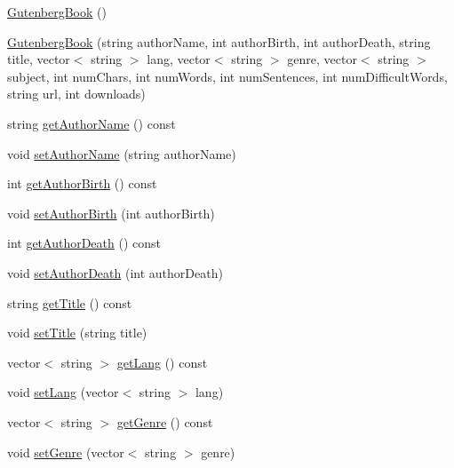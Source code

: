 \begin{DoxyCompactItemize}
\item 
\hyperlink{classbridges_1_1_gutenberg_book_a289c167dd11eed17cce39a59931f246c}{Gutenberg\+Book} ()
\item 
\hyperlink{classbridges_1_1_gutenberg_book_ab792768f0f2567835e90659f163f4438}{Gutenberg\+Book} (string author\+Name, int author\+Birth, int author\+Death, string title, vector$<$ string $>$ lang, vector$<$ string $>$ genre, vector$<$ string $>$ subject, int num\+Chars, int num\+Words, int num\+Sentences, int num\+Difficult\+Words, string url, int downloads)
\item 
string \hyperlink{classbridges_1_1_gutenberg_book_afacaf4beed079b9ac71622f1b24ff964}{get\+Author\+Name} () const 
\item 
void \hyperlink{classbridges_1_1_gutenberg_book_ab7b3a1d3398b75100b8d3fb7936b3ac9}{set\+Author\+Name} (string author\+Name)
\item 
int \hyperlink{classbridges_1_1_gutenberg_book_aca4767ac651f6bd056c3ae9dca394bad}{get\+Author\+Birth} () const 
\item 
void \hyperlink{classbridges_1_1_gutenberg_book_a33ac2e6063319064006fa72b6fcfb0dc}{set\+Author\+Birth} (int author\+Birth)
\item 
int \hyperlink{classbridges_1_1_gutenberg_book_a1a03188161b257b68fe667c4e95080c7}{get\+Author\+Death} () const 
\item 
void \hyperlink{classbridges_1_1_gutenberg_book_acf1e81a3b635fb939bc6af772a61fd3c}{set\+Author\+Death} (int author\+Death)
\item 
string \hyperlink{classbridges_1_1_gutenberg_book_a77e678b4fc06d6d64e75a80a8350ed05}{get\+Title} () const 
\item 
void \hyperlink{classbridges_1_1_gutenberg_book_a5038252948e5f173dad4926c0970c5d3}{set\+Title} (string title)
\item 
vector$<$ string $>$ \hyperlink{classbridges_1_1_gutenberg_book_af1cbc9738f379426d259927595d3e7bb}{get\+Lang} () const 
\item 
void \hyperlink{classbridges_1_1_gutenberg_book_ab8cf27c1e496eb34d1e74e8343b4a466}{set\+Lang} (vector$<$ string $>$ lang)
\item 
vector$<$ string $>$ \hyperlink{classbridges_1_1_gutenberg_book_a33d4be418ed0322727797dfc9b81a88f}{get\+Genre} () const 
\item 
void \hyperlink{classbridges_1_1_gutenberg_book_a2b81b6cf785ea9dfef0a1b1e15331b38}{set\+Genre} (vector$<$ string $>$ genre)
\item 

\end{DoxyCompactItemize}
